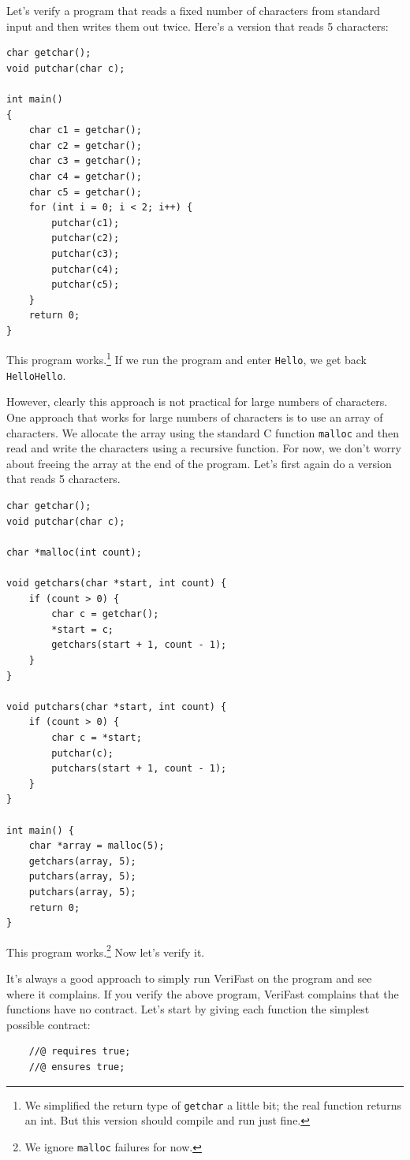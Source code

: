 \documentclass{article}
\begin{document}
Let's verify a program that reads a fixed number of characters
from standard input and then writes them out twice.
Here's a version that reads 5 characters:
\begin{lstlisting}
char getchar();
void putchar(char c);

int main()
{
    char c1 = getchar();
    char c2 = getchar();
    char c3 = getchar();
    char c4 = getchar();
    char c5 = getchar();
    for (int i = 0; i < 2; i++) {
        putchar(c1);
        putchar(c2);
        putchar(c3);
        putchar(c4);
        putchar(c5);
    }
    return 0;
}
\end{lstlisting}
This program works.\footnote{We simplified the return type of \lstinline!getchar! a little bit; the real function returns an int. But this version should compile and run just fine.}
If we run the program and enter \texttt{Hello}, we get back \texttt{HelloHello}.

However, clearly this approach is not practical for large numbers of characters. One approach that works for large numbers of characters is to use an array of characters. We allocate
the array using the standard C function \lstinline!malloc! and then read and write the characters using a recursive function. For now, we don't worry about freeing the array at the end
of the program. Let's first again do a version that reads 5 characters.
\begin{lstlisting}
char getchar();
void putchar(char c);

char *malloc(int count);

void getchars(char *start, int count) {
    if (count > 0) {
        char c = getchar();
        *start = c;
        getchars(start + 1, count - 1);
    }
}

void putchars(char *start, int count) {
    if (count > 0) {
        char c = *start;
        putchar(c);
        putchars(start + 1, count - 1);
    }
}

int main() {
    char *array = malloc(5);
    getchars(array, 5);
    putchars(array, 5);
    putchars(array, 5);
    return 0;
}
\end{lstlisting}
This program works.\footnote{We ignore \lstinline!malloc! failures for now.} Now let's verify it.

It's always a good approach to simply run VeriFast on the program and see where it complains. If you verify the above program, VeriFast complains that the functions have no contract.
Let's start by giving each function the simplest possible contract:
\begin{lstlisting}
    //@ requires true;
    //@ ensures true;
\end{lstlisting}
\end{document}
